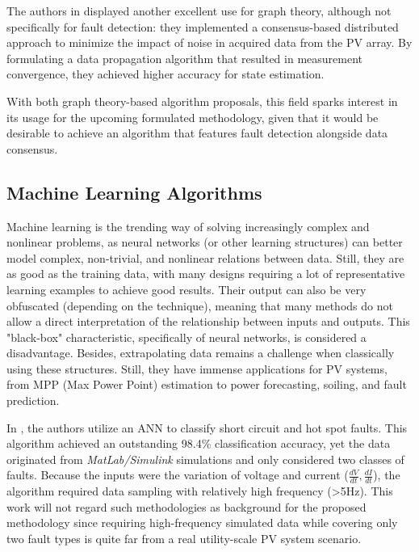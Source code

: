 The authors in \cite{Katoch2018} displayed another excellent use for graph theory, although not specifically for fault detection: they implemented a consensus-based distributed approach to minimize the impact of noise in acquired data from the PV array. By formulating a data propagation algorithm that resulted in measurement convergence, they achieved higher accuracy for state estimation.

With both graph theory-based algorithm proposals, this field sparks interest in its usage for the upcoming formulated methodology, given that it would be desirable to achieve an algorithm that features fault detection alongside data consensus.


\subsection{Machine Learning Algorithms} \label{subsec:machinelearning}

Machine learning is the trending way of solving increasingly complex and nonlinear problems, as neural networks (or other learning structures) can better model complex, non-trivial, and nonlinear relations between data. Still, they are as good as the training data, with many designs requiring a lot of representative learning examples to achieve good results. Their output can also be very obfuscated (depending on the technique), meaning that many methods do not allow a direct interpretation of the relationship between inputs and outputs. This "black-box" characteristic, specifically of neural networks, is considered a disadvantage. Besides, extrapolating data remains a challenge when classically using these structures. Still, they have immense applications for PV systems, from MPP (Max Power Point) estimation to power forecasting, soiling, and fault prediction.

In \cite{Kumari2022}, the authors utilize an ANN to classify short circuit and hot spot faults. This algorithm achieved an outstanding 98.4\% classification accuracy, yet the data originated from \textit{MatLab/Simulink} simulations and only considered two classes of faults. Because the inputs were the variation of voltage and current ($\frac{dV}{dt},\frac{dI}{dt}$), the algorithm required data sampling with relatively high frequency (>5Hz). This work will not regard such methodologies as background for the proposed methodology since requiring high-frequency simulated data while covering only two fault types is quite far from a real utility-scale PV system scenario.

